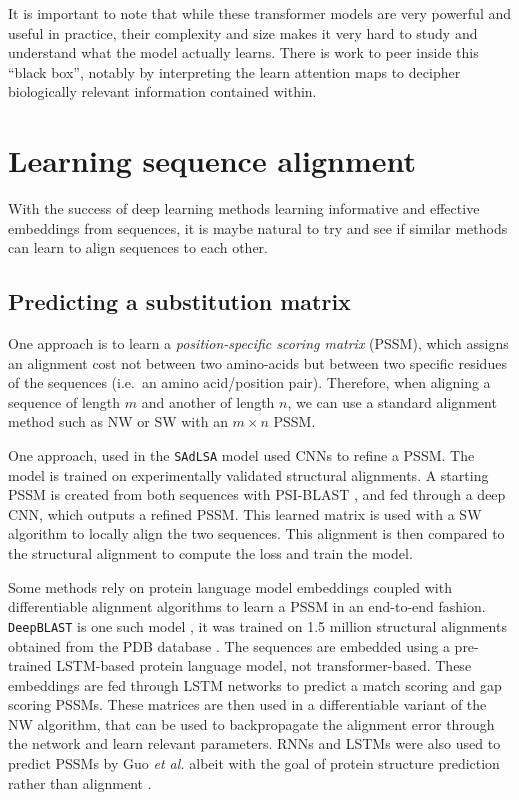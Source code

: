 \documentclass[
  11pt,
  twoside,
  BCOR=10mm,
  listof=totoc]{scrbook}
\begin{document}
It is important to note that while these transformer models are very powerful and useful in practice, their complexity and size makes it very hard to study and understand what the model actually learns. There is work to peer inside this ``black box'', notably by interpreting the learn attention maps \autocite{vigBERTologyMeetsBiology2021} to decipher biologically relevant information contained within.

\hypertarget{learning-sequence-alignment}{%
\section{Learning sequence alignment}\label{learning-sequence-alignment}}

With the success of deep learning methods learning informative and effective embeddings from sequences, it is maybe natural to try and see if similar methods can learn to align sequences to each other.

\hypertarget{predicting-a-substitution-matrix}{%
\subsection{Predicting a substitution matrix}\label{predicting-a-substitution-matrix}}

One approach is to learn a \emph{position-specific scoring matrix} (PSSM), which assigns an alignment cost not between two amino-acids but between two specific residues of the sequences (i.e.~an amino acid/position pair). Therefore, when aligning a sequence of length \(m\) and another of length \(n\), we can use a standard alignment method such as NW or SW with an \(m\times n\) PSSM.

One approach, used in the \texttt{SAdLSA} model \autocite{gaoNovelSequenceAlignment2021} used CNNs to refine a PSSM. The model is trained on experimentally validated structural alignments. A starting PSSM is created from both sequences with PSI-BLAST \autocite{altschulGappedBLASTPSIBLAST1997}, and fed through a deep CNN, which outputs a refined PSSM. This learned matrix is used with a SW algorithm to locally align the two sequences. This alignment is then compared to the structural alignment to compute the loss and train the model.

Some methods rely on protein language model embeddings coupled with differentiable alignment algorithms to learn a PSSM in an end-to-end fashion. \texttt{DeepBLAST} is one such model \autocite{mortonProteinStructuralAlignments2020}, it was trained on 1.5 million structural alignments obtained from the PDB database \autocite{bermanWorldwideProteinData2007}. The sequences are embedded using a pre-trained LSTM-based protein language model, not transformer-based. These embeddings are fed through LSTM networks to predict a match scoring and gap scoring PSSMs. These matrices are then used in a differentiable variant of the NW algorithm, that can be used to backpropagate the alignment error through the network and learn relevant parameters. RNNs and LSTMs were also used to predict PSSMs by Guo \emph{et al.} albeit with the goal of protein structure prediction rather than alignment \autocite{guoComprehensiveStudyEnhancing2021}.
\end{document}
